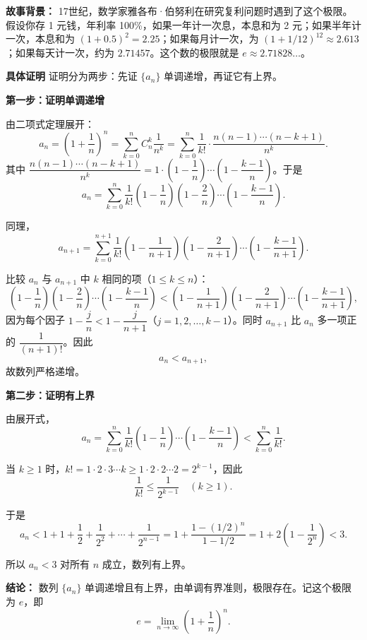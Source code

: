 \documentclass{ctexart}
\newenvironment{custom}[1]{\par\noindent \textbf{#1}\quad}{\par\vspace{1em}}
\begin{document}
\textbf{故事背景：} 17世纪，数学家雅各布·伯努利在研究复利问题时遇到了这个极限。假设你存 1 元钱，年利率 100\%，如果一年计一次息，本息和为 2 元；如果半年计一次，本息和为 \((1+0.5)^2 = 2.25\)；如果每月计一次，为 \((1+1/12)^{12} \approx 2.613\)；如果每天计一次，约为 \(2.71457\)。这个数的极限就是 \(e \approx 2.71828\ldots\)。

\begin{custom}{具体证明}
证明分为两步：先证 \(\{a_n\}\) 单调递增，再证它有上界。

\noindent\textbf{第一步：证明单调递增}

由二项式定理展开：
\[
a_n = \left(1+\dfrac{1}{n}\right)^n = \sum_{k=0}^{n} C_n^k \dfrac{1}{n^k} = \sum_{k=0}^{n} \dfrac{1}{k!} \cdot \dfrac{n(n-1)\cdots(n-k+1)}{n^k}.
\]
其中 \(\dfrac{n(n-1)\cdots(n-k+1)}{n^k} = 1 \cdot \left(1-\dfrac{1}{n}\right) \cdots \left(1-\dfrac{k-1}{n}\right)\)。于是
\[
a_n = \sum_{k=0}^{n} \dfrac{1}{k!} \left(1-\dfrac{1}{n}\right)\left(1-\dfrac{2}{n}\right)\cdots\left(1-\dfrac{k-1}{n}\right).
\]

同理，
\[
a_{n+1} = \sum_{k=0}^{n+1} \dfrac{1}{k!} \left(1-\dfrac{1}{n+1}\right)\left(1-\dfrac{2}{n+1}\right)\cdots\left(1-\dfrac{k-1}{n+1}\right).
\]

比较 \(a_n\) 与 \(a_{n+1}\) 中 \(k\) 相同的项（\(1 \leq k \leq n\)）：
\[
\left(1-\dfrac{1}{n}\right)\left(1-\dfrac{2}{n}\right)\cdots\left(1-\dfrac{k-1}{n}\right) < \left(1-\dfrac{1}{n+1}\right)\left(1-\dfrac{2}{n+1}\right)\cdots\left(1-\dfrac{k-1}{n+1}\right),
\]
因为每个因子 \(1-\dfrac{j}{n} < 1-\dfrac{j}{n+1}\)（\(j=1,2,\dots,k-1\)）。同时 \(a_{n+1}\) 比 \(a_n\) 多一项正的 \(\dfrac{1}{(n+1)!}\)。因此
\[
a_n < a_{n+1},
\]
故数列严格递增。

\noindent\textbf{第二步：证明有上界}

由展开式，
\[
a_n = \sum_{k=0}^{n} \dfrac{1}{k!} \left(1-\dfrac{1}{n}\right)\cdots\left(1-\dfrac{k-1}{n}\right) < \sum_{k=0}^{n} \dfrac{1}{k!}.
\]

当 \(k \geq 1\) 时，\(k! = 1 \cdot 2 \cdot 3 \cdots k \geq 1 \cdot 2 \cdot 2 \cdots 2 = 2^{k-1}\)，因此
\[
\dfrac{1}{k!} \leq \dfrac{1}{2^{k-1}} \quad (k \geq 1).
\]

于是
\[
a_n < 1 + 1 + \dfrac{1}{2} + \dfrac{1}{2^2} + \cdots + \dfrac{1}{2^{n-1}} = 1 + \dfrac{1 - (1/2)^n}{1 - 1/2} = 1 + 2\left(1 - \dfrac{1}{2^n}\right) < 3.
\]

所以 \(a_n < 3\) 对所有 \(n\) 成立，数列有上界。

\noindent\textbf{结论：} 数列 \(\{a_n\}\) 单调递增且有上界，由单调有界准则，极限存在。记这个极限为 \(e\)，即
\[
e = \lim_{n\to\infty} \left(1+\dfrac{1}{n}\right)^n.
\]
\end{custom}
\end{document}
